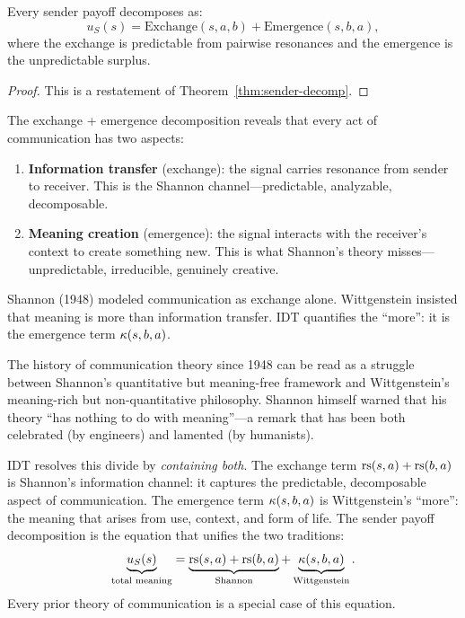 \begin{theorem}
\label{thm:exchange-emergence}
Every sender payoff decomposes as:
\[
u_S(s) = \text{Exchange}(s, a, b) + \text{Emergence}(s, b, a),
\]
where the exchange is predictable from pairwise resonances and the emergence
is the unpredictable surplus.
\end{theorem}

\begin{proof}
This is a restatement of Theorem~\ref{thm:sender-decomp}.
\end{proof}

\begin{interpretation}
The exchange + emergence decomposition reveals that every act of communication
has two aspects:
\begin{enumerate}
\item \textbf{Information transfer} (exchange): the signal carries resonance
from sender to receiver. This is the Shannon channel---predictable,
analyzable, decomposable.
\item \textbf{Meaning creation} (emergence): the signal interacts with the
receiver's context to create something new. This is what Shannon's theory
misses---unpredictable, irreducible, genuinely creative.
\end{enumerate}
Shannon (1948) modeled communication as exchange alone. Wittgenstein insisted
that meaning is more than information transfer. IDT quantifies the ``more'':
it is the emergence term $\kappa(s, b, a)$.
\end{interpretation}

\begin{remark}
The history of communication theory since 1948 can be read as a struggle
between Shannon's quantitative but meaning-free framework and
Wittgenstein's meaning-rich but non-quantitative philosophy. Shannon
himself warned that his theory ``has nothing to do with meaning''---a
remark that has been both celebrated (by engineers) and lamented (by
humanists).

IDT resolves this divide by \emph{containing both}. The exchange term
$\mathrm{rs}(s, a) + \mathrm{rs}(b, a)$ is Shannon's information channel: it captures
the predictable, decomposable aspect of communication. The emergence term
$\kappa(s, b, a)$ is Wittgenstein's ``more'': the meaning that arises
from use, context, and form of life. The sender payoff decomposition
is the equation that unifies the two traditions:
\[
\underbrace{u_S(s)}_{\text{total meaning}} =
\underbrace{\mathrm{rs}(s,a) + \mathrm{rs}(b,a)}_{\text{Shannon}} +
\underbrace{\kappa(s,b,a)}_{\text{Wittgenstein}}.
\]
Every prior theory of communication is a special case of this equation.
\end{remark}


